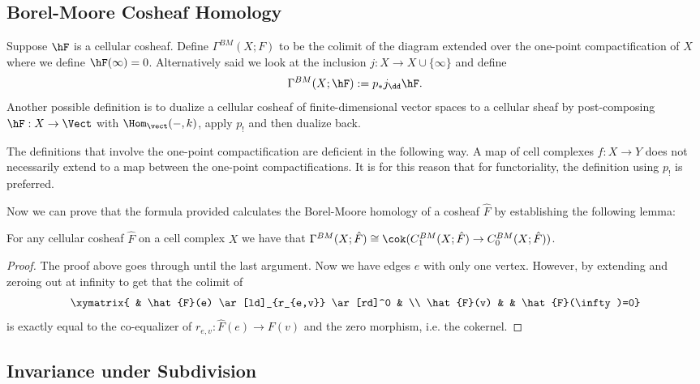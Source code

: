 \subsection{Borel-Moore Cosheaf Homology}
\label{subsubsec:BM_cosheaf_homology}
\begin{defn}\label{defn:BM_cosheaf_homology}
 Suppose $\hF$ is a cellular cosheaf. Define $\Gamma^{BM}(X;F)$ to be the colimit of the diagram extended over the one-point compactification of $X$ where we define $\hF(\infty)=0$. Alternatively said we look at the inclusion $j:X\to X\cup\{\infty\}$ and define
\[
	\Gamma^{BM}(X;\hF):=p_*j_{\dd}\hF.
\]
Another possible definition is to dualize a cellular cosheaf of finite-dimensional vector spaces to a cellular sheaf by post-composing $\hF:X\to\Vect$ with $\Hom_{\vect}(-,k)$, apply $p_!$ and then dualize back.
\end{defn}

\begin{rmk}[Functoriality]
	The definitions that involve the one-point compactification are deficient in the following way. A map of cell complexes $f:X\to Y$ does not necessarily extend to a map between the one-point compactifications. It is for this reason that for functoriality, the definition using $p_!$ is preferred.
\end{rmk}

Now we can prove that the formula provided calculates the Borel-Moore homology of a cosheaf $\hat{F}$ by establishing the following lemma:

\begin{lem}\label{lem:BM_cosheaf_homology}
 For any cellular cosheaf $\hat{F}$ on a cell complex $X$ we have that $\Gamma^{BM}(X;\hat{F})\cong \cok(C_1^{BM}(X;\hat{F})\to C^{BM}_0(X;\hat{F}))$.
\end{lem}
\begin{proof}
 The proof above goes through until the last argument. Now we have edges $e$ with only one vertex. However, by extending and zeroing out at infinity to get that the colimit of
\[
 \xymatrix{ & \hat{F}(e) \ar[ld]_{r_{e,v}} \ar[rd]^0 & \\
\hat{F}(v) & & \hat{F}(\infty)=0}
\]
is exactly equal to the co-equalizer of $r_{e,v}:\hat{F}(e)\to F(v)$ and the zero morphism, i.e. the cokernel.
\end{proof}

\subsection{Invariance under Subdivision}
\label{subsubsec:subdivision}

